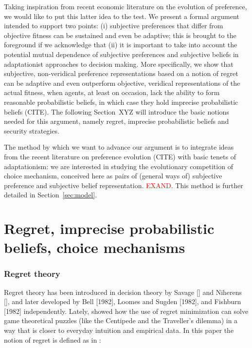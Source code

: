 \documentclass[fleqn,reqno,11pt]{article}
\begin{document}
Taking inspiration from recent economic literature on the evolution of preference, we would
like to put this latter idea to the test. We present a formal argument intended to support two
points: (i) subjective preferences that differ from objective fitness can be sustained and even
be adaptive; this is brought to the foreground if we acknowledge that (ii) it is important to
take into account the potential mutual dependence of subjective preferences and subjective
beliefs in adaptationist approaches to decision making. More specifically, we show that
subjective, non-veridical preference representations based on a notion of regret can be
adaptive and even outperform objective, veridical representations of the actual fitness, when
agents, at least on occasion, lack the ability to form reasonable probabilistic beliefs, in
which case they hold imprecise probabilistic beliefs (CITE). The following Section~XYZ will
introduce the basic notions needed for this argument, namely regret, imprecise probabilistic
beliefs and security strategies.

The method by which we want to advance our argument is to integrate ideas from the recent
literature on preference evolution (CITE) with basic tenets of adaptationism: we are interested
in studying the evolutionary competition of choice mechanism, conceived here as pairs of
(general ways of) subjective preference and subjective belief
representation. \textcolor{red}{EXAND}. This method is further detailed in
Section~\ref{sec:model}.

\section{Regret, imprecise probabilistic beliefs, choice mechanisms}

\subsubsection{Regret theory} \label{sec:regreTheory}


Regret theory has been introduced in decision theory by Savage [] and Niherens [], and later
developed by Bell [1982], Loomes and Sugden [1982], and Fishburn [1982] independently. Lately,
\citet{HalpernPass2012:Iterated-Regret} showed how the use of regret minimization can solve
game theoretical puzzles (like the Centipede and the Traveller's dilemma) in a way that is
closer to everyday intuition and empirical data. In this paper the notion of regret is defined
as in \citet{HalpernPass2012:Iterated-Regret}:
\end{document}
